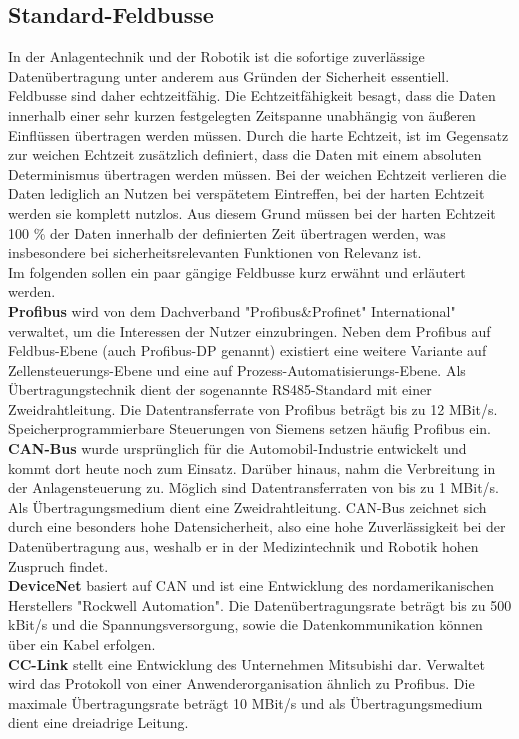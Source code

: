 \documentclass[ a4paper,
                oneside,
                toc=bibliography,
                toc=listof
                ]{scrbook}
\begin{document}
	\subsection{Standard-Feldbusse}
	In der Anlagentechnik und der Robotik ist die sofortige zuverlässige Datenübertragung unter anderem aus Gründen der Sicherheit essentiell. Feldbusse sind daher echtzeitfähig. Die Echtzeitfähigkeit besagt, dass die Daten innerhalb einer sehr kurzen festgelegten Zeitspanne unabhängig von äußeren Einflüssen übertragen werden müssen. Durch die harte Echtzeit, ist im Gegensatz zur weichen Echtzeit zusätzlich definiert, dass die Daten mit einem absoluten Determinismus übertragen werden müssen. Bei der weichen Echtzeit verlieren die Daten lediglich an Nutzen bei verspätetem Eintreffen, bei der harten Echtzeit werden sie komplett nutzlos. Aus diesem Grund müssen bei der harten Echtzeit 100 \% der Daten innerhalb der definierten Zeit übertragen werden, was insbesondere bei sicherheitsrelevanten Funktionen von Relevanz ist. \cite{dopatka2008framework} \cite{Echtzeit} \\
	Im folgenden sollen ein paar gängige Feldbusse kurz erwähnt und erläutert werden.\\
	\textbf{Profibus} wird von dem Dachverband "Profibus\&Profinet" International" verwaltet, um die Interessen der Nutzer einzubringen. Neben dem Profibus auf Feldbus-Ebene (auch Profibus-DP genannt) existiert eine weitere Variante auf Zellensteuerungs-Ebene und eine auf Prozess-Automatisierungs-Ebene. Als Übertragungstechnik dient der sogenannte RS485-Standard mit einer Zweidrahtleitung. Die Datentransferrate von Profibus beträgt bis zu 12 MBit/s. Speicherprogrammierbare Steuerungen von Siemens setzen häufig Profibus ein.  \cite{hering2012elektrotechnik}\\
	\textbf{CAN-Bus} wurde ursprünglich für die Automobil-Industrie entwickelt und kommt dort heute noch zum Einsatz. Darüber hinaus, nahm die Verbreitung in der Anlagensteuerung zu. Möglich sind Datentransferraten von bis zu 1 MBit/s. Als Übertragungsmedium dient eine Zweidrahtleitung.  CAN-Bus zeichnet sich durch eine besonders hohe Datensicherheit, also eine hohe Zuverlässigkeit bei der Datenübertragung aus, weshalb er in der Medizintechnik und Robotik hohen Zuspruch findet. \cite{hering2012elektrotechnik}\\
	\textbf{DeviceNet} basiert auf CAN und ist eine Entwicklung des nordamerikanischen Herstellers "Rockwell Automation". Die Datenübertragungsrate beträgt bis zu 500 kBit/s und die Spannungsversorgung, sowie die Datenkommunikation können über ein Kabel erfolgen. \cite{hering2012elektrotechnik}\\
	\textbf{CC-Link} stellt eine Entwicklung des Unternehmen Mitsubishi dar. Verwaltet wird das Protokoll von einer Anwenderorganisation ähnlich zu Profibus. Die maximale Übertragungsrate beträgt 10 MBit/s und als Übertragungsmedium dient eine dreiadrige Leitung. \cite{hering2012elektrotechnik}\\
\end{document}
